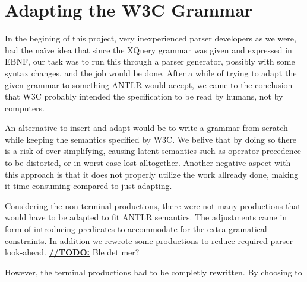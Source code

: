 \section{Adapting the W3C Grammar}
\label{sect:discussion:adaptW3C}

In the begining of this project, very inexperienced parser developers as we were, had the na\"{i}ve idea that since the XQuery grammar was given and expressed in EBNF, our task was to run this through a parser generator, possibly with some syntax changes, and the job would be done. After a while of trying to adapt the given grammar to something ANTLR would accept, we came to the conclusion that W3C probably intended the specification to be read by humans, not by computers.

An alternative to insert and adapt would be to write a grammar from scratch while keeping the semantics specified by W3C. We belive that by doing so there is a risk of over simplifying, causing latent semantics such as operator precedence to be distorted, or in worst case lost alltogether. Another negative aspect with this approach is that it does not properly utilize the work allready done, making it time consuming compared to just adapting.

Considering the non-terminal productions, there were not many productions that would have to be adapted to fit ANTLR semantics. The adjustments came in form of introducing predicates to accommodate for the extra-gramatical constraints. In addition we rewrote some productions to reduce required parser look-ahead. \underline{\textbf{\LARGE //TODO:}} Ble det mer?

However, the terminal productions had to be completly rewritten. By choosing to
